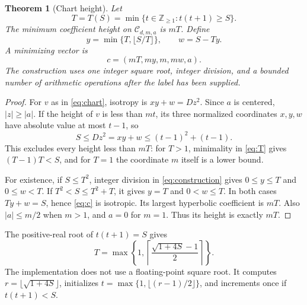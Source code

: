 \documentclass[11pt]{article}
\newtheorem{theorem}{Theorem}[section]
\theoremstyle{remark}\newtheorem{remark}[theorem]{Remark}
\newcommand{\Z}{\mathbb Z}\newcommand{\Q}{\mathbb Q}\newcommand{\R}{\mathbb R}
\begin{document}
\begin{theorem}[Chart height]\label{thm:chart}
Let
\begin{equation}\label{eq:T}
 T=T(S)=\min\{t\in\Z_{\geq1}:t(t+1)\geq S\}.
\end{equation}
The minimum coefficient height on $\mathcal C_{d,m,a}$ is $mT$. Define
\begin{equation}\label{eq:construction}
 y=\min\{T,\lfloor S/T\rfloor\},\qquad w=S-Ty.
\end{equation}
A minimizing vector is
\begin{equation}\label{eq:c}
 c=(mT,my,m,mw,a).
\end{equation}
The construction uses one integer square root, integer division, and a bounded number of arithmetic operations after the label has been supplied.
\end{theorem}
\begin{proof}
For $v$ as in \eqref{eq:chart}, isotropy is $xy+w=Dz^2$. Since $a$ is centered, $|z|\geq|a|$. If the height of $v$ is less than $mt$, its three normalized coordinates $x,y,w$ have absolute value at most $t-1$, so
\[
 S\leq Dz^2=xy+w\leq(t-1)^2+(t-1).
\]
This excludes every height less than $mT$: for $T>1$, minimality in \eqref{eq:T} gives $(T-1)T<S$, and for $T=1$ the coordinate $m$ itself is a lower bound.

For existence, if $S\leq T^2$, integer division in \eqref{eq:construction} gives $0\leq y\leq T$ and $0\leq w<T$. If $T^2<S\leq T^2+T$, it gives $y=T$ and $0<w\leq T$. In both cases $Ty+w=S$, hence \eqref{eq:c} is isotropic. Its largest hyperbolic coefficient is $mT$. Also $|a|\leq m/2$ when $m>1$, and $a=0$ for $m=1$. Thus its height is exactly $mT$.
\end{proof}

The positive-real root of $t(t+1)=S$ gives
\[
 T=\max\left\{1,\left\lceil\frac{\sqrt{1+4S}-1}{2}\right\rceil\right\}.
\]
The implementation does not use a floating-point square root. It computes $r=\lfloor\sqrt{1+4S}\rfloor$, initializes $t=\max\{1,\lfloor(r-1)/2\rfloor\}$, and increments once if $t(t+1)<S$.
\end{document}
